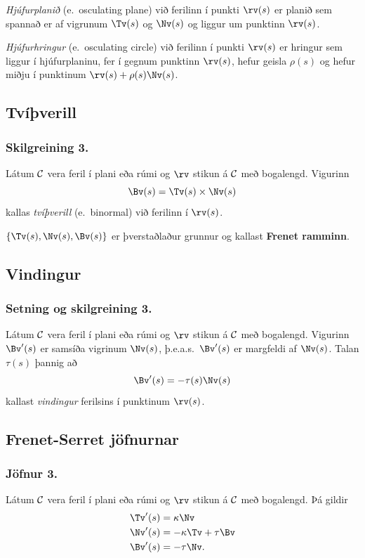 {\em Hjúfurplanið} (e.~osculating plane) við ferilinn í punkti $\rv(s)$ er planið sem spannað er af  vigrunum $\Tv(s)$ og $\Nv(s)$ og liggur um punktinn $\rv(s)$.

{\em Hjúfurhringur} (e.~osculating circle) við ferilinn í punkti
$\rv(s)$ er hringur sem liggur í hjúfurplaninu, fer í gegnum punktinn
$\rv(s)$, hefur geisla $\rho(s)$ og hefur miðju í punktinum
$\rv(s)+\rho(s)\Nv(s)$. 
 



\subsection{Tvíþverill}
 \subsubsection{Skilgreining 3.}
   Látum $\cal C$ vera feril í plani eða rúmi og
$\rv$ stikun á $\cal C$ með bogalengd.  Vigurinn  
$$\Bv(s)=\Tv(s)\times \Nv(s)$$
kallas {\em tvíþverill} (e.~binormal) við ferilinn í $\rv(s)$.
 

 \bigskip
 $\{\Tv(s),\Nv(s),\Bv(s)\}$ er þverstaðlaður grunnur og kallast \textbf{Frenet ramminn}.


\subsection{Vindingur}
 \subsubsection{Setning og skilgreining 3.}
  Látum $\cal C$ vera feril í plani
eða rúmi og $\rv$ stikun á $\cal C$ með bogalengd.  Vigurinn $\Bv'(s)$ er
samsíða vigrinum $\Nv(s)$, þ.e.a.s.~$\Bv'(s)$ er margfeldi af $\Nv(s)$.
Talan $\tau(s)$ þannig að  
$$\Bv'(s)=-\tau(s)\Nv(s)$$
kallast {\em vindingur} ferilsins í punktinum $\rv(s)$.

 




\subsection{Frenet-Serret jöfnurnar}
 \subsubsection{Jöfnur 3.}
   Látum $\cal C$ vera feril í plani
eða rúmi og $\rv$ stikun á $\cal C$ með bogalengd.  Þá gildir 
\begin{align*}
\Tv'(s)&=\kappa\Nv\\
\Nv'(s)&=-\kappa\Tv+\tau\Bv\\
\Bv'(s)&=-\tau\Nv.
\end{align*}
 



